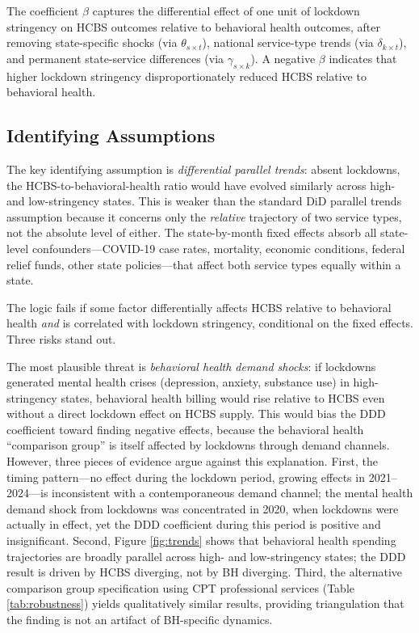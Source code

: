 \documentclass[12pt]{article}
\begin{document}
The coefficient $\beta$ captures the differential effect of one unit of lockdown stringency on HCBS outcomes relative to behavioral health outcomes, after removing state-specific shocks (via $\theta_{s \times t}$), national service-type trends (via $\delta_{k \times t}$), and permanent state-service differences (via $\gamma_{s \times k}$). A negative $\beta$ indicates that higher lockdown stringency disproportionately reduced HCBS relative to behavioral health.

\subsection{Identifying Assumptions}

The key identifying assumption is \textit{differential parallel trends}: absent lockdowns, the HCBS-to-behavioral-health ratio would have evolved similarly across high- and low-stringency states. This is weaker than the standard DiD parallel trends assumption because it concerns only the \textit{relative} trajectory of two service types, not the absolute level of either. The state-by-month fixed effects absorb all state-level confounders---COVID-19 case rates, mortality, economic conditions, federal relief funds, other state policies---that affect both service types equally within a state.

The logic fails if some factor differentially affects HCBS relative to behavioral health \textit{and} is correlated with lockdown stringency, conditional on the fixed effects. Three risks stand out.

The most plausible threat is \textit{behavioral health demand shocks}: if lockdowns generated mental health crises (depression, anxiety, substance use) in high-stringency states, behavioral health billing would rise relative to HCBS even without a direct lockdown effect on HCBS supply. This would bias the DDD coefficient toward finding negative effects, because the behavioral health ``comparison group'' is itself affected by lockdowns through demand channels. However, three pieces of evidence argue against this explanation. First, the timing pattern---no effect during the lockdown period, growing effects in 2021--2024---is inconsistent with a contemporaneous demand channel; the mental health demand shock from lockdowns was concentrated in 2020, when lockdowns were actually in effect, yet the DDD coefficient during this period is positive and insignificant. Second, Figure \ref{fig:trends} shows that behavioral health spending trajectories are broadly parallel across high- and low-stringency states; the DDD result is driven by HCBS diverging, not by BH diverging. Third, the alternative comparison group specification using CPT professional services (Table \ref{tab:robustness}) yields qualitatively similar results, providing triangulation that the finding is not an artifact of BH-specific dynamics.
\end{document}

